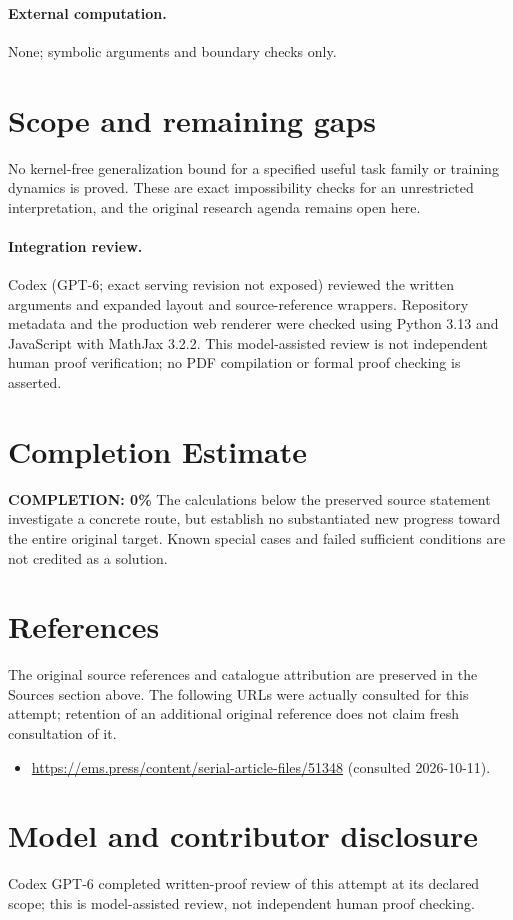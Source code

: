 \documentclass[11pt]{article}
\begin{document}
\paragraph{External computation.} None; symbolic arguments and boundary checks only.
\section{Scope and remaining gaps}
No kernel-free generalization bound for a specified useful task family or training dynamics is proved. These are exact impossibility checks for an unrestricted interpretation, and the original research agenda remains open here.
\paragraph{Integration review.} Codex (GPT-6; exact serving revision not exposed) reviewed the written arguments and expanded layout and source-reference wrappers. Repository metadata and the production web renderer were checked using Python 3.13 and JavaScript with MathJax 3.2.2. This model-assisted review is not independent human proof verification; no PDF compilation or formal proof checking is asserted.

\section{Completion Estimate}
\noindent\textbf{COMPLETION: 0\%}
The calculations below the preserved source statement investigate a concrete route,
but establish no substantiated new progress toward the entire original target.
Known special cases and failed sufficient conditions are not credited as a solution.
\section{References}
The original source references and catalogue attribution are preserved in the
Sources section above. The following URLs were actually consulted for this attempt;
retention of an additional original reference does not claim fresh consultation of it.
\begin{itemize}
\item \url{https://ems.press/content/serial-article-files/51348} (consulted 2026-10-11). 
\end{itemize}
\section{Model and contributor disclosure}
Codex GPT-6 completed written-proof review of this attempt at its declared scope; this is model-assisted review, not independent human proof checking.
\end{document}

